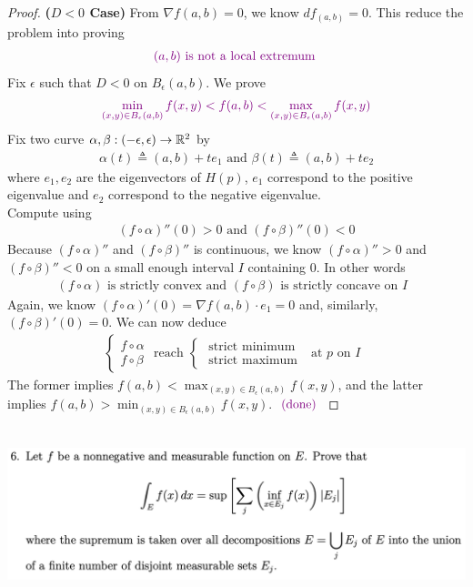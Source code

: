\documentclass{report}
\begin{document}
\begin{proof}
\textbf{($D<0$ Case)} From $\nabla f(a,b)=0$, we know $df_{(a,b)}=0$. This reduce the problem into proving 
\begin{align*}
\textcolor{violet}{(a,b)\text{ is not a local extremum }}
\end{align*}
Fix $\epsilon $ such that $D<0$ on  $B_{\epsilon }(a,b)$. We prove 
\begin{align*}
  \textcolor{violet}{\min_{(x,y)\in B_\epsilon (a,b)}f(x,y) <f(a,b)< \max_{(x,y)\in B_{\epsilon }(a,b)}f(x,y)}
\end{align*}
Fix two curve $\alpha ,\beta :(-\epsilon ,\epsilon )\rightarrow \mathbb{R}^2$ by
\begin{align*}
\alpha (t)\triangleq (a,b)+te_1\text{ and }\beta (t)\triangleq (a,b)+te_2
\end{align*}
where $e_1,e_2$ are the eigenvectors of  $H(p)$, $e_1$ correspond to the positive eigenvalue and $e_2$ correspond to the negative eigenvalue. \\

Compute using 
\begin{align*}
  (f\circ \alpha )''(0)>0 \text{ and }(f\circ \beta  )''(0)<0
\end{align*}
Because $(f\circ \alpha )''$ and $(f\circ \beta )''$ is continuous, we know $(f\circ \alpha )''>0$ and $(f\circ \beta )''<0$ on a small enough interval $I$ containing $0$. In other words 
\begin{align*}
  (f\circ \alpha )\text{ is strictly convex and }(f\circ \beta )\text{ is strictly concave on $I$ }
\end{align*}
Again, we know $(f\circ \alpha )'(0)=\nabla f(a,b)\cdot e_1=0$ and, similarly, $(f\circ \beta )'(0)=0$. We can now deduce 
\begin{align*}
  \begin{cases}
    f\circ \alpha \\
    f\circ \beta 
  \end{cases}\text{ reach }\begin{cases}
    \text{ strict minimum }\\
     \text{ strict maximum }
  \end{cases}\text{ at $p$ on  $I$ }
\end{align*}
The former implies $f(a,b)< \max_{(x,y)\in B_\epsilon (a,b)}f(x,y)$, and the latter implies $f(a,b)> \min_{(x,y)\in B_{\epsilon }(a,b)}f(x,y)$. $\textcolor{violet}{\text{ (done) }}$ 
\end{proof}
\begin{question}{}{}
\includegraphics[height=5cm,width=18cm]{hw6a6}
\end{question}
\end{document}
